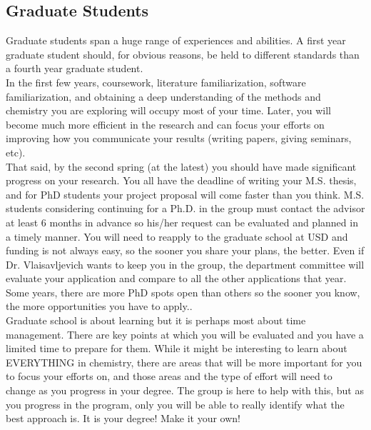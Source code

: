 \documentclass[letterpaper]{article}
\begin{document}
\subsection*{Graduate Students}
Graduate students span a huge range of experiences and abilities. A first year graduate student should, for obvious reasons, be held to different standards than a fourth year graduate student.\\

In the first few years, coursework, literature familiarization, software familiarization, and obtaining a deep understanding of the methods and chemistry you are exploring will occupy most of your time. Later, you will become much more efficient in the research and can focus your efforts on improving how you communicate your results (writing papers, giving seminars, etc). \\

That said, by the second spring (at the latest) you should have made significant progress on your research. You all have the deadline of writing your M.S. thesis, and for PhD students your project proposal will come faster than you think. M.S. students considering continuing for a Ph.D. in the group must contact the advisor at least 6 months in advance so his/her request can be evaluated and planned in a timely manner. You will need to reapply to the graduate school at USD and funding is not always easy, so the sooner you share your plans, the better. Even if Dr. Vlaisavljevich wants to keep you in the group, the department committee will evaluate your application and compare to all the other applications that year. Some years, there are more PhD spots open than others so the sooner you know, the more opportunities you have to apply.. \\

Graduate school is about learning but it is perhaps most about time management.  There are key points at which you will be evaluated and you have a limited time to prepare for them. While it might be interesting to learn about EVERYTHING in chemistry, there are areas that will be more important for you to focus your efforts on, and those areas and the type of effort will need to change as you progress in your degree. The group is here to help with this, but as you progress in the program, only you will be able to really identify what the best approach is. It is your degree! Make it your own!
\end{document}
